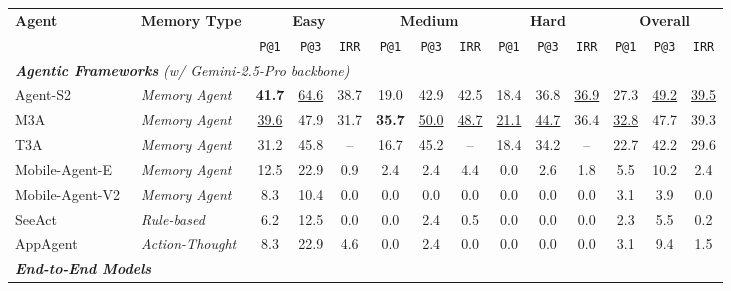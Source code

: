 \documentclass{llmxive}
\providecommand{\arraystretch}{1.06}
\begin{document}
\begin{table}[t]
  \centering
  \footnotesize
  \renewcommand{\arraystretch}{1.06}
  \setlength{\tabcolsep}{3.2pt}
  \begin{adjustbox}{max width=\textwidth}
  \begin{tabular}{@{}ll | ccc | ccc | ccc | ccc@{}}
    \toprule
    \multirow{2}{*}{\textbf{Agent}} & \multirow{2}{*}{\textbf{Memory Type}} &
      \multicolumn{3}{c|}{\textbf{Easy}} &
      \multicolumn{3}{c|}{\textbf{Medium}} &
      \multicolumn{3}{c|}{\textbf{Hard}} &
      \multicolumn{3}{c}{\textbf{Overall}} \\
    \cmidrule(lr){3-5} \cmidrule(lr){6-8} \cmidrule(lr){9-11} \cmidrule(l){12-14}
    & & \texttt{P@1} & \texttt{P@3} & \texttt{IRR} & \texttt{P@1} & \texttt{P@3} & \texttt{IRR} & \texttt{P@1} & \texttt{P@3} & \texttt{IRR} & \texttt{P@1} & \texttt{P@3} & \texttt{IRR} \\
    \midrule
    \multicolumn{14}{l}{\textit{\textbf{Agentic Frameworks}} \textit{(w/ Gemini-2.5-Pro backbone)}} \\
    \midrule
    Agent-S2~\cite{agashe2025agent} & \textit{Memory Agent} & \textbf{41.7} & \underline{64.6} & 38.7 & 19.0 & 42.9 & 42.5 & 18.4 & 36.8 & \underline{36.9} & 27.3 & \underline{49.2} & \underline{39.5} \\
    M3A~\cite{rawles2025androidworld} & \textit{Memory Agent} & \underline{39.6} & 47.9 & 31.7 & \textbf{35.7} & \underline{50.0} & \underline{48.7} & \underline{21.1} & \underline{44.7} & 36.4 & \underline{32.8} & 47.7 & 39.3 \\
    T3A~\cite{rawles2025androidworld} & \textit{Memory Agent} & 31.2 & 45.8 & -- & 16.7 & 45.2 & -- & 18.4 & 34.2 & -- & 22.7 & 42.2 & 29.6 \\
    Mobile-Agent-E~\cite{wang2025mobileagentselfevolving} & \textit{Memory Agent} & 12.5 & 22.9 & 0.9 & 2.4 & 2.4 & 4.4 & 0.0 & 2.6 & 1.8 & 5.5 & 10.2 & 2.4 \\
    Mobile-Agent-V2~\cite{wang2024mobile} & \textit{Memory Agent} & 8.3 & 10.4 & 0.0 & 0.0 & 0.0 & 0.0 & 0.0 & 0.0 & 0.0 & 3.1 & 3.9 & 0.0 \\
    SeeAct~\cite{zheng2024seeact} & \textit{Rule-based} & 6.2 & 12.5 & 0.0 & 0.0 & 2.4 & 0.5 & 0.0 & 0.0 & 0.0 & 2.3 & 5.5 & 0.2 \\
    AppAgent~\cite{zhang2025appagent} & \textit{Action-Thought} & 8.3 & 22.9 & 4.6 & 0.0 & 2.4 & 0.0 & 0.0 & 0.0 & 0.0 & 3.1 & 9.4 & 1.5 \\
    \midrule
    \multicolumn{14}{l}{\textit{\textbf{End-to-End Models}}} \\

\end{tabular}
\end{adjustbox}
\end{table}
\end{document}
